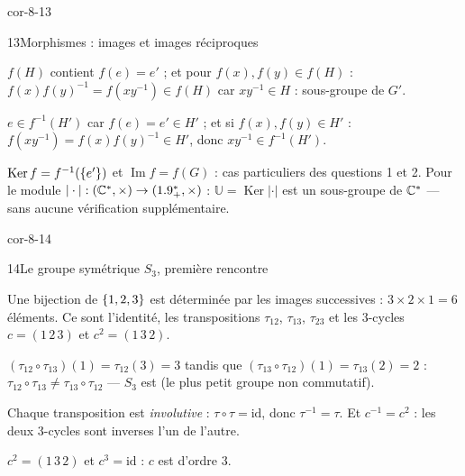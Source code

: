 \begin{blocLivre}{cor-8-13}
\begin{corrige}{13}{Morphismes : images et images réciproques}
\begin{questions}
  \item $f(H)$ contient $f(e)=e'$ ; et pour $f(x),f(y)\in f(H)$ :
    $f(x)f(y)^{-1}=f(xy^{-1})\in f(H)$ car $xy^{-1}\in H$ : sous-groupe
    de $G'$.
  \item $e\in f^{-1}(H')$ car $f(e)=e'\in H'$ ; et si
    $f(x),f(y)\in H'$ : $f(xy^{-1})=f(x)f(y)^{-1}\in H'$, donc
    $xy^{-1}\in f^{-1}(H')$.
  \item $\operatorname{Ker}f=f^{-1}(\left\{e'\right\})$ et
    $\operatorname{Im}f=f(G)$ : cas particuliers des questions 1 et 2.
    Pour le module $|\cdot|:(\mathbb{C}^{*},\times)\to(1.9_{+}^{*},\times)$ :
    $\mathbb{U}=\operatorname{Ker}|\cdot|$ est un sous-groupe de
    $\mathbb{C}^{*}$ — sans aucune vérification supplémentaire.
\end{questions}
\end{corrige}
\end{blocLivre}

\begin{blocLivre}{cor-8-14}
\begin{corrige}{14}{Le groupe symétrique $S_3$, première rencontre}
\begin{questions}
  \item Une bijection de $\left\{1,2,3\right\}$ est déterminée par les images
    successives : $3\times2\times1=6$ éléments. Ce sont l'identité, les
    transpositions $\tau_{12}$, $\tau_{13}$, $\tau_{23}$ et les 3-cycles
    $c=(1\,2\,3)$ et $c^{2}=(1\,3\,2)$.
  \item $(\tau_{12}\circ\tau_{13})(1)=\tau_{12}(3)=3$ tandis que
    $(\tau_{13}\circ\tau_{12})(1)=\tau_{13}(2)=2$ :
    $\tau_{12}\circ\tau_{13}\neq\tau_{13}\circ\tau_{12}$ — $S_3$ est
     (le plus petit groupe non commutatif).
  \item Chaque transposition est \emph{involutive} :
    $\tau\circ\tau=\mathrm{id}$, donc $\tau^{-1}=\tau$. Et
    $c^{-1}=c^{2}$ : les deux 3-cycles sont inverses l'un de l'autre.
  \item $c^{2}=(1\,3\,2)$ et $c^{3}=\mathrm{id}$ : $c$ est d'ordre $3$.
\end{questions}
\end{corrige}
\end{blocLivre}

